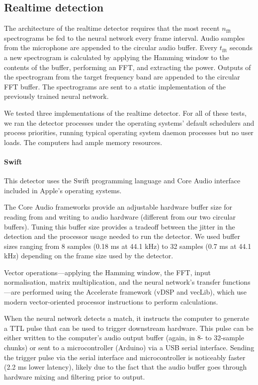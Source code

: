 \documentclass[10pt,letterpaper]{article}
\renewcommand{\subsubsection}[1]{\paragraph{#1}}
\begin{document}
\subsection{Realtime detection}

The architecture of the realtime detector requires that the most
recent $n_\textrm{fft}$ spectrograms be fed to the neural network
every frame interval.  Audio samples from the microphone are appended
to the circular audio buffer.  Every $t_\textrm{fft}$ seconds a new
spectrogram is calculated by applying the Hamming window to the
contents of the buffer, performing an FFT, and extracting the
power. Outputs of the spectrogram from the target frequency band are
appended to the circular FFT buffer.  The spectrograms are sent to a
static implementation of the previously trained neural network.

We tested three implementations of the realtime detector.  For all of
these tests, we ran the detector processes under the operating
systems' default schedulers and process priorities, running typical
operating system daemon processes but no user loads.  The computers
had ample memory resources.

\subsubsection{Swift}

This detector uses the Swift programming language and Core Audio
interface included in Apple's operating systems.

The Core Audio frameworks provide an adjustable hardware buffer size
for reading from and writing to audio hardware (different from our two
circular buffers). Tuning this buffer size provides a tradeoff between
the jitter in the detection and the processor usage needed to run the
detector. We used buffer sizes ranging from 8 samples (0.18 ms at 44.1
kHz) to 32 samples (0.7 ms at 44.1 kHz) depending on the frame size 
used by the detector.

Vector operations---applying the Hamming window, the FFT, input
normalisation, matrix multiplication, and the neural network's
transfer functions---are performed using the Accelerate framework
(vDSP and vecLib), which use modern vector-oriented processor
instructions to perform calculations.

When the neural network detects a match, it instructs the computer to
generate a TTL pulse that can be used to trigger downstream hardware.
This pulse can be either written to the computer's audio output buffer
(again, in 8- to 32-sample chunks) or sent to a microcontroller
(Arduino) via a USB serial interface. Sending the trigger pulse via
the serial interface and microcontroller is noticeably faster (2.2 ms
lower latency), likely due to the fact that the audio buffer goes
through hardware mixing and filtering prior to output.
\end{document}
